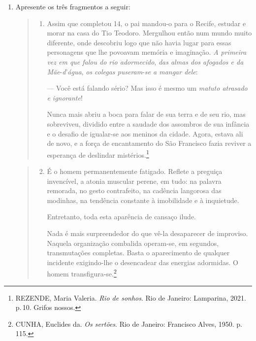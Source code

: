 \documentclass{extarticle}
\begin{document}
\begin{enumerate}
\item Apresente os três fragmentos a seguir:

\begin{quote}
\begin{enumerate}
\item Assim que completou 14, o pai mandou-o para o Recife, estudar e
morar na casa do Tio Teodoro. Mergulhou então num mundo muito
diferente, onde descobriu logo que não havia lugar para essas
personagens que lhe povoavam memória e imaginação. \emph{A primeira
vez em que falou do rio adormecido}, \emph{das almas dos afogados e
da Mãe}-\emph{d}'\emph{água}, \emph{os colegas puseram}-\emph{se a
mangar dele}:

--- Você está falando sério? Mas isso é mesmo um \emph{matuto atrasado
e ignorante}!

Nunca mais abriu a boca para falar de sua terra e de seu rio, mas
sobreviveu, dividido entre a saudade dos assombros de sua infância e
o desafio de igualar-se aos meninos da cidade. Agora, estava ali de
novo, e a força de encantamento do São Francisco fazia reviver a
esperança de deslindar mistérios.\footnote{REZENDE, Maria Valeria. \emph{Rio de sonhos}. Rio de Janeiro: Lamparina, 2021. p.\,10. Grifos nossos.}
\end{enumerate}
\end{quote}

\begin{quote}
\begin{enumerate}
\setcounter{enumii}{1}
\item É o homem permanentemente fatigado. Reflete a preguiça invencível, a
atonia muscular perene, em tudo: na palavra remorada, no gesto
contrafeito, na cadência langorosa das modinhas, na tendência
constante à imobilidade e à inquietude.

Entretanto, toda esta aparência de cansaço ilude.

Nada é mais surpreendedor do que vê-la desaparecer de improviso.
Naquela organização combalida operam-se, em segundos, transmutações
completas. Basta o aparecimento de qualquer incidente exigindo-lhe o
desencadear das energias adormidas. O homem transfigura-se.\footnote{CUNHA, Euclides da. \emph{Os sertões}. Rio de Janeiro: Francisco Alves, 1950. p.\,115.}
\end{enumerate}
\end{quote}


\end{enumerate}
\end{document}
